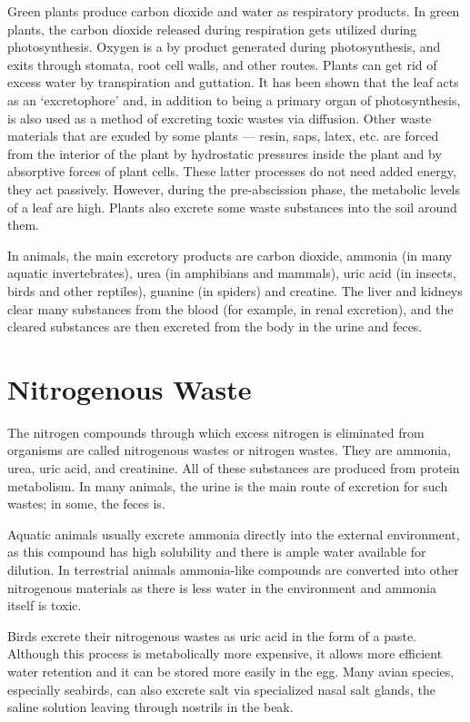 Green plants produce carbon dioxide and water as respiratory products. In green plants, the carbon dioxide released during respiration gets utilized during photosynthesis. Oxygen is a by product generated during photosynthesis, and exits through stomata, root cell walls, and other routes. Plants can get rid of excess water by transpiration and guttation. It has been shown that the leaf acts as an `excretophore' and, in addition to being a primary organ of photosynthesis, is also used as a method of excreting toxic wastes via diffusion. Other waste materials that are exuded by some plants --- resin, saps, latex, etc. are forced from the interior of the plant by hydrostatic pressures inside the plant and by absorptive forces of plant cells. These latter processes do not need added energy, they act passively. However, during the pre-abscission phase, the metabolic levels of a leaf are high. Plants also excrete some waste substances into the soil around them.

In animals, the main excretory products are carbon dioxide, ammonia (in many aquatic invertebrates), urea (in amphibians and mammals), uric acid (in insects, birds and other reptiles), guanine (in spiders) and creatine. The liver and kidneys clear many substances from the blood (for example, in renal excretion), and the cleared substances are then excreted from the body in the urine and feces.

\hypertarget{nitrogenous-waste}{%
\section{Nitrogenous Waste}\label{nitrogenous-waste}}

The nitrogen compounds through which excess nitrogen is eliminated from organisms are called nitrogenous wastes or nitrogen wastes. They are ammonia, urea, uric acid, and creatinine. All of these substances are produced from protein metabolism. In many animals, the urine is the main route of excretion for such wastes; in some, the feces is.

Aquatic animals usually excrete ammonia directly into the external environment, as this compound has high solubility and there is ample water available for dilution. In terrestrial animals ammonia-like compounds are converted into other nitrogenous materials as there is less water in the environment and ammonia itself is toxic.

Birds excrete their nitrogenous wastes as uric acid in the form of a paste. Although this process is metabolically more expensive, it allows more efficient water retention and it can be stored more easily in the egg. Many avian species, especially seabirds, can also excrete salt via specialized nasal salt glands, the saline solution leaving through nostrils in the beak.

